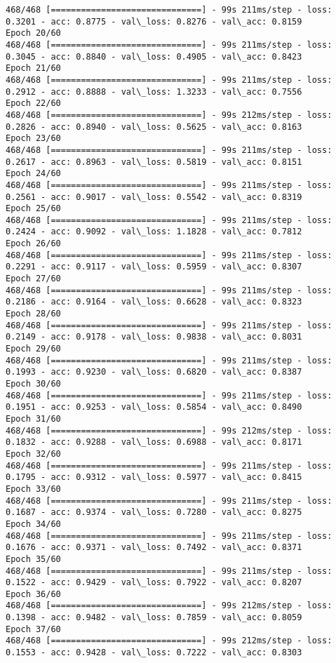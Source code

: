 \documentclass[11pt]{article}
\begin{document}
\begin{Verbatim}[commandchars=\\\{\}]
468/468 [==============================] - 99s 211ms/step - loss: 0.3201 - acc: 0.8775 - val\_loss: 0.8276 - val\_acc: 0.8159
Epoch 20/60
468/468 [==============================] - 99s 211ms/step - loss: 0.3045 - acc: 0.8840 - val\_loss: 0.4905 - val\_acc: 0.8423
Epoch 21/60
468/468 [==============================] - 99s 211ms/step - loss: 0.2912 - acc: 0.8888 - val\_loss: 1.3233 - val\_acc: 0.7556
Epoch 22/60
468/468 [==============================] - 99s 212ms/step - loss: 0.2826 - acc: 0.8940 - val\_loss: 0.5625 - val\_acc: 0.8163
Epoch 23/60
468/468 [==============================] - 99s 211ms/step - loss: 0.2617 - acc: 0.8963 - val\_loss: 0.5819 - val\_acc: 0.8151
Epoch 24/60
468/468 [==============================] - 99s 211ms/step - loss: 0.2561 - acc: 0.9017 - val\_loss: 0.5542 - val\_acc: 0.8319
Epoch 25/60
468/468 [==============================] - 99s 211ms/step - loss: 0.2424 - acc: 0.9092 - val\_loss: 1.1828 - val\_acc: 0.7812
Epoch 26/60
468/468 [==============================] - 99s 211ms/step - loss: 0.2291 - acc: 0.9117 - val\_loss: 0.5959 - val\_acc: 0.8307
Epoch 27/60
468/468 [==============================] - 99s 211ms/step - loss: 0.2186 - acc: 0.9164 - val\_loss: 0.6628 - val\_acc: 0.8323
Epoch 28/60
468/468 [==============================] - 99s 211ms/step - loss: 0.2149 - acc: 0.9178 - val\_loss: 0.9838 - val\_acc: 0.8031
Epoch 29/60
468/468 [==============================] - 99s 211ms/step - loss: 0.1993 - acc: 0.9230 - val\_loss: 0.6820 - val\_acc: 0.8387
Epoch 30/60
468/468 [==============================] - 99s 211ms/step - loss: 0.1951 - acc: 0.9253 - val\_loss: 0.5854 - val\_acc: 0.8490
Epoch 31/60
468/468 [==============================] - 99s 212ms/step - loss: 0.1832 - acc: 0.9288 - val\_loss: 0.6988 - val\_acc: 0.8171
Epoch 32/60
468/468 [==============================] - 99s 211ms/step - loss: 0.1795 - acc: 0.9312 - val\_loss: 0.5977 - val\_acc: 0.8415
Epoch 33/60
468/468 [==============================] - 99s 211ms/step - loss: 0.1687 - acc: 0.9374 - val\_loss: 0.7280 - val\_acc: 0.8275
Epoch 34/60
468/468 [==============================] - 99s 211ms/step - loss: 0.1676 - acc: 0.9371 - val\_loss: 0.7492 - val\_acc: 0.8371
Epoch 35/60
468/468 [==============================] - 99s 211ms/step - loss: 0.1522 - acc: 0.9429 - val\_loss: 0.7922 - val\_acc: 0.8207
Epoch 36/60
468/468 [==============================] - 99s 212ms/step - loss: 0.1398 - acc: 0.9482 - val\_loss: 0.7859 - val\_acc: 0.8059
Epoch 37/60
468/468 [==============================] - 99s 212ms/step - loss: 0.1553 - acc: 0.9428 - val\_loss: 0.7222 - val\_acc: 0.8303

\end{Verbatim}
\end{document}
